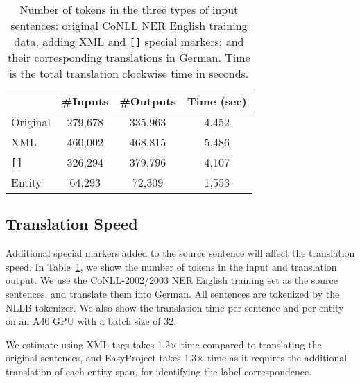 \documentclass[11pt,dvipsnames]{article}
\begin{document}
\begin{table}[t!]
\centering
\small

\begin{tabular}{lccc}
\toprule
 & \#Inputs  & \#Outputs & Time (sec)\\
\midrule
Original & 279,678 & 335,963 & 4,452\\
XML & 460,002 & 468,815 & 5,486\\
\texttt{[]} & 326,294 & 379,796 & 4,107\\
Entity & 64,293 & 72,309 & 1,553\\
\bottomrule
\end{tabular}
\vspace{-5pt}
\caption{Number of tokens in the three types of input sentences: original CoNLL NER English training data, adding XML and {\tt []} special markers; and their corresponding  translations  in German. Time is the total translation clockwise time in seconds.}
\label{table:marker_time}
\vspace{-20pt}
\end{table}


\subsection{Translation Speed}
\label{appendix:translation_time}



Additional special markers added to the source sentence will affect the translation speed.
In Table~\ref{table:marker_time}, we show the number of tokens in the input and translation output. We use  the CoNLL-2002/2003 NER English training set as the source sentences, and translate them into German. All sentences are tokenized by the NLLB tokenizer.
We also show the translation time per sentence and per entity  on an A40 GPU with a batch size of 32. 

We estimate using XML tags takes 1.2$\times$  time compared to translating the original sentences, and EasyProject takes 1.3$\times$ time as it requires the additional translation of each entity span, for identifying the label correspondence.
\end{document}
